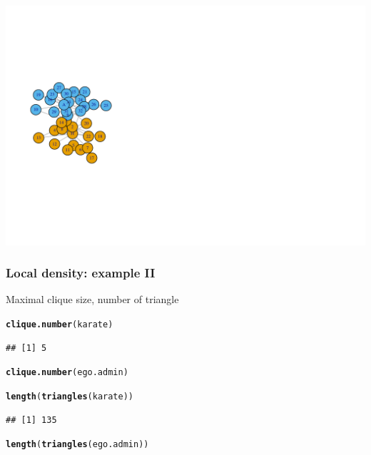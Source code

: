 \documentclass{beamer}\usepackage[]{graphicx}\usepackage[]{color}
\makeatletter
\newcommand{\hlstd}[1]{\textcolor[rgb]{0.345,0.345,0.345}{#1}}%
\newcommand{\hlkwd}[1]{\textcolor[rgb]{0.737,0.353,0.396}{\textbf{#1}}}%
\newenvironment{kframe}{%
 \def\at@end@of@kframe{}%
 \ifinner\ifhmode%
  \def\at@end@of@kframe{\end{minipage}}%
  \begin{minipage}{\columnwidth}%
 \fi\fi%
 \def\FrameCommand##1{\hskip\@totalleftmargin \hskip-\fboxsep
 \colorbox{shadecolor}{##1}\hskip-\fboxsep
     \hskip-\linewidth \hskip-\@totalleftmargin \hskip\columnwidth}%
 \MakeFramed {\advance\hsize-\width
   \@totalleftmargin\z@ \linewidth\hsize
   \@setminipage}}%
 {\par\unskip\endMakeFramed%
 \at@end@of@kframe}
\newenvironment{knitrout}{}{} %
\makeatother
\begin{document}
\begin{frame}[fragile]
\begin{knitrout}
\begin{kframe}
{\ttfamily\noindent\bfseries\color{errorcolor}{\#\# Error in plot(ego.admin): object 'ego.admin' not found}}\end{kframe}
\includegraphics[width=.8\textwidth]{figures/density3-1} 

\end{knitrout}

\end{frame}

\begin{frame}[fragile]
  \frametitle{Local density: example II}

Maximal clique size, number of triangle
\begin{knitrout}\scriptsize
{}\color{fgcolor}\begin{kframe}
\begin{alltt}
\hlkwd{clique.number}\hlstd{(karate)}
\end{alltt}
\begin{verbatim}
## [1] 5
\end{verbatim}
\begin{alltt}
\hlkwd{clique.number}\hlstd{(ego.admin)}
\end{alltt}


{\ttfamily\noindent\bfseries{}}\begin{alltt}
\hlkwd{length}\hlstd{(}\hlkwd{triangles}\hlstd{(karate))}
\end{alltt}
\begin{verbatim}
## [1] 135
\end{verbatim}
\begin{alltt}
\hlkwd{length}\hlstd{(}\hlkwd{triangles}\hlstd{(ego.admin))}
\end{alltt}


{\ttfamily\noindent\bfseries{}}\end{kframe}
\end{knitrout}

\end{frame}
\end{document}
